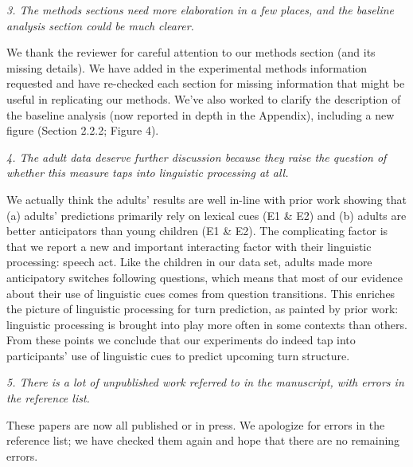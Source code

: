 \documentclass[11pt,a4paper]{letter} %
\begin{document}
\begin{letter}{}
\smallskip

\noindent \textit{3. The methods sections need more elaboration in a few places, and the baseline analysis section could be much clearer.}

\noindent We thank the reviewer for careful attention to our methods section (and its missing details). We have added in the experimental methods information requested and have re-checked each section for missing information that might be useful in replicating our methods. We've also worked to clarify the description of the baseline analysis (now reported in depth in the Appendix), including a new figure (Section 2.2.2; Figure 4). 

\smallskip

\noindent \textit{4. The adult data deserve further discussion because they raise the question of whether this measure taps into linguistic processing at all.}

\noindent We actually think the adults' results are well in-line with prior work showing that (a) adults' predictions primarily rely on lexical cues (E1 \& E2) and (b) adults are better anticipators than young children (E1 \& E2). The complicating factor is that we report a new and important interacting factor with their linguistic processing: speech act. Like the children in our data set, adults made more anticipatory switches following questions, which means that most of our evidence about their use of linguistic cues comes from question transitions. This enriches the picture of linguistic processing for turn prediction, as painted by prior work: linguistic processing is brought into play more often in some contexts than others. From these points we conclude that our experiments do indeed tap into participants' use of linguistic cues to predict upcoming turn structure.

\smallskip

\noindent \textit{5. There is a lot of unpublished work referred to in the manuscript, with errors in the reference list.}

\noindent These papers are now all published or in press. We apologize for errors in the reference list; we have checked them again and hope that there are no remaining errors.


\end{letter}
\end{document}

